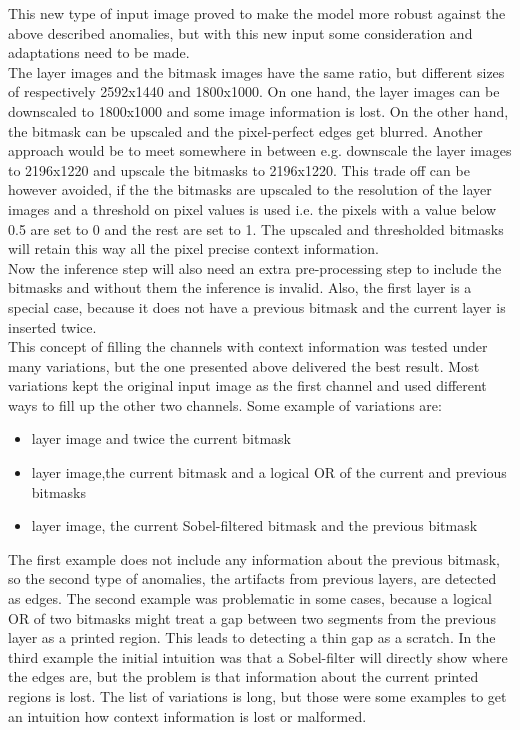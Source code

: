 This new type of input image proved to make the model more robust against the above described anomalies, but with this new input some consideration and adaptations need to be made. \\
The layer images and the bitmask images have the same ratio, but different sizes of respectively 2592x1440 and 1800x1000. On one hand, the layer images can be downscaled to 1800x1000 and some image information is lost. On the other hand, the bitmask can be upscaled and the pixel-perfect edges get blurred. Another approach would be to meet somewhere in between e.g. downscale the layer images to 2196x1220 and upscale the bitmasks to 2196x1220. This trade off can be however avoided, if the the bitmasks are upscaled to the resolution of the layer images and a threshold on pixel values is used i.e. the pixels with a value below 0.5 are set to 0 and the rest are set to 1. The upscaled and thresholded bitmasks will retain this way all the pixel precise context information.  \\
Now the inference step will also need an extra pre-processing step to include the bitmasks and without them the inference is invalid. Also, the first layer is a special case, because it does not have a previous bitmask and the current layer is inserted twice. \\
This concept of filling the channels with context information was tested under many variations, but the one presented above delivered the best result. Most variations kept the original input image as the first channel and used different ways to fill up the other two channels. Some example of variations are:
\begin{itemize}
\item layer image and twice the current bitmask
\item layer image,the current bitmask and a logical OR of the current and previous bitmasks
\item layer image, the current Sobel-filtered bitmask and the previous bitmask
\end{itemize}
The first example does not include any information about the previous bitmask, so the second type of anomalies, the artifacts from previous layers, are detected as edges. The second example was problematic in some cases, because a logical OR of two bitmasks might treat a gap between two segments from the previous layer as a printed region. This leads to detecting a thin gap as a scratch. In the third example the initial intuition was that a Sobel-filter will directly show where the edges are, but the problem is that information about the current printed regions is lost. The list of variations is long, but those were some examples to get an intuition how context information is lost or malformed.


